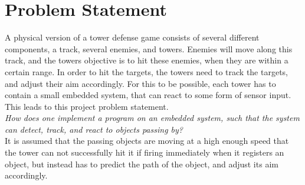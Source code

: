 \section{Problem Statement}\label{sec:problemstatement}
A physical version of a tower defense game consists of several different components, a track, several enemies, and towers. Enemies will move along this track, and the towers objective is to hit these enemies, when they are within a certain range. In order to hit the targets, the towers need to track the targets, and adjust their aim accordingly. For this to be possible, each tower has to contain a small embedded system, that can react to some form of sensor input. This leads to this project problem statement. \\

\textit{How does one implement a program on an embedded system, such that the system can detect, track, and react to objects passing by?}\\

It is assumed that the passing objects are moving at a high enough speed that the tower can not successfully hit it if firing immediately when it registers an object, but instead has to predict the path of the object, and adjust its aim accordingly.

